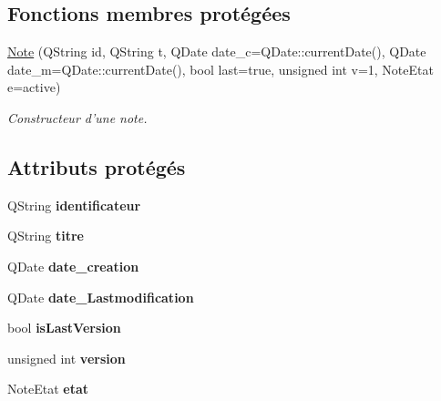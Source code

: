 \subsection*{Fonctions membres protégées}
\begin{DoxyCompactItemize}
\item 
\hyperlink{class_note_a1a696a0d5858ed217abc94a4c5640b7d}{Note} (Q\-String id, Q\-String t, Q\-Date date\-\_\-c=Q\-Date\-::current\-Date(), Q\-Date date\-\_\-m=Q\-Date\-::current\-Date(), bool last=true, unsigned int v=1, Note\-Etat e=active)
\begin{DoxyCompactList}\small\item\em Constructeur d'une note. \end{DoxyCompactList}\end{DoxyCompactItemize}
\subsection*{Attributs protégés}
\begin{DoxyCompactItemize}
\item 
\hypertarget{class_note_aacc7ebfda42d05b0dc5805ce9a9bcf73}{Q\-String {\bfseries identificateur}}\label{class_note_aacc7ebfda42d05b0dc5805ce9a9bcf73}

\item 
\hypertarget{class_note_a4f3aceb1ee03caa1f37a08880fe44f47}{Q\-String {\bfseries titre}}\label{class_note_a4f3aceb1ee03caa1f37a08880fe44f47}

\item 
\hypertarget{class_note_aa66b1aada95c18e3072dfcadb5137b20}{Q\-Date {\bfseries date\-\_\-creation}}\label{class_note_aa66b1aada95c18e3072dfcadb5137b20}

\item 
\hypertarget{class_note_a32dc337cdff9731eda7135426f87caf2}{Q\-Date {\bfseries date\-\_\-\-Lastmodification}}\label{class_note_a32dc337cdff9731eda7135426f87caf2}

\item 
\hypertarget{class_note_a081a30b2091a39a2c1a9da70a48df736}{bool {\bfseries is\-Last\-Version}}\label{class_note_a081a30b2091a39a2c1a9da70a48df736}

\item 
\hypertarget{class_note_a4d40f017d6f24cad4ae1f7c8046234df}{unsigned int {\bfseries version}}\label{class_note_a4d40f017d6f24cad4ae1f7c8046234df}

\item 
\hypertarget{class_note_ae81f84fc605e97173019e668744be3eb}{Note\-Etat {\bfseries etat}}\label{class_note_ae81f84fc605e97173019e668744be3eb}

\end{DoxyCompactItemize}
